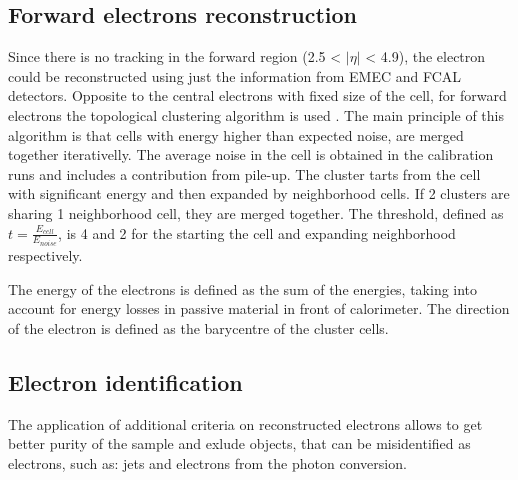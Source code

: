 \subsection{Forward electrons reconstruction}
Since there is no tracking in the forward region (2.5 < $|\eta|$ < 4.9), the electron could be reconstructed using just the information from EMEC and FCAL detectors. Opposite to the central electrons with fixed size of the cell, for forward electrons the topological clustering algorithm is used \cite{Lampl:1099735}. The main principle of this algorithm is that cells with energy higher than expected noise, are merged together iterativelly. The average noise in the cell is obtained in the calibration runs and includes a contribution from pile-up. The cluster tarts from the cell with significant energy and then expanded by neighborhood cells. If 2 clusters are sharing 1 neighborhood cell, they are merged together. The threshold, defined as $t=\frac{E_{cell}}{E_{noise}}$, is 4 and 2 for the starting the cell and expanding neighborhood respectively. 

The energy of the electrons is defined as the sum of the energies, taking into account for energy losses in passive material in front of calorimeter. The direction of the electron is defined as the barycentre of the cluster cells.
\subsection{Electron identification}

The application of additional criteria on reconstructed electrons allows to get better purity of the sample and exlude objects, that can be misidentified as electrons, such as: jets and electrons from the photon conversion. 

